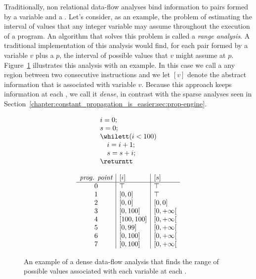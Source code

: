 Traditionally, non relational data-flow analyses bind information to pairs formed by a variable and a \progpoint.
Let's consider, as an example, the problem of estimating the interval of values that any integer variable may assume throughout the execution of a program.
An algorithm that solves this problem is called a {\em range analysis}.
A traditional implementation of this analysis would find, for each pair formed by a variable $v$ plus a \progpoint $p$, the interval of possible values that $v$ might assume at $p$.
Figure~\ref{fig:rangeAnalysis} illustrates this analysis with an example.
In this case we call a \progpoint any region between two consecutive
instructions and we let $[v]$ denote the abstract information that is associated
with variable $v$.
Because this approach keeps information at each \progpoint, we call it {\em dense}, in contrast with the sparse analyses seen in Section~\ref{chapter:constant_propagation_is_easier:sec:prop-engine}.

\begin{figure}[t!]
\centering
\begin{minipage}[b]{0.2\textwidth}%
\begin{equation*}
\begin{array}[b]{l}
i=0;\\
s=0;\\
\whilett (i<100)\\
\quad i=i+1;\\
\quad s=s+i;\\
\returntt
\end{array}
\end{equation*}
\vspace{1cm}
\end{minipage}
\begin{minipage}[b]{0.4\textwidth}%
\end{minipage}\hfill
\begin{minipage}[b]{0.35\textwidth}
\begin{equation*}
\begin{array}[b]{c|l|l}
\textit{prog. point} & [i] & [s]\\ \hline
0 & \top & \top\\
1 & [0,0] & \top\\
2 & [0,0] & [0,0]\\
3 & [0,100] & [0, +\infty[\\
4 & [100,100] & [0,+\infty[\\
5 & [0,99] & [0,+\infty[\\
6 & [0,100] & [0,+\infty[\\
7 & [0,100] & [0,+\infty[\\
\end{array}
\end{equation*}
\vspace{1cm}
\end{minipage}
\caption{An example of a dense data-flow analysis that finds the range of
possible values associated with each variable at each \progpoint.}
\label{fig:rangeAnalysis}
\end{figure}

